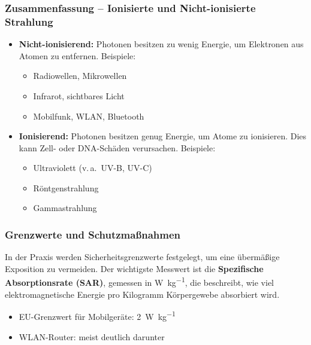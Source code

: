 \subsubsection{Zusammenfassung -- Ionisierte und  \newline Nicht-ionisierte Strahlung}
\vspace{1em}
\begin{tcolorbox}[physikbox,title=Ionisierende und Nicht-ionisierende Strahlung]
	\label{box:ionisierende}
	\begin{itemize}
		\item \textbf{Nicht-ionisierend:} Photonen besitzen zu wenig Energie, um Elektronen aus Atomen zu entfernen. Beispiele:
		\begin{itemize}
			\item Radiowellen, Mikrowellen
			\item Infrarot, sichtbares Licht
			\item Mobilfunk, WLAN, Bluetooth
		\end{itemize}
		\item \textbf{Ionisierend:} Photonen besitzen genug Energie, um Atome zu ionisieren. Dies kann Zell- oder DNA-Schäden verursachen. Beispiele:
		\begin{itemize}
			\item Ultraviolett (v.\,a.\ UV-B, UV-C)
			\item Röntgenstrahlung
			\item Gammastrahlung
		\end{itemize}
	\end{itemize}
\end{tcolorbox}
\vspace{1em}
\subsubsection{Grenzwerte und Schutzmaßnahmen}

In der Praxis werden Sicherheitsgrenzwerte festgelegt, um eine übermäßige Exposition zu vermeiden. Der wichtigste Messwert ist die \textbf{Spezifische Absorptionsrate (SAR)}, gemessen in \si{\watt\per\kilogram}, die beschreibt, wie viel elektromagnetische Energie pro Kilogramm Körpergewebe absorbiert wird.

\begin{itemize}
	\item EU-Grenzwert für Mobilgeräte: \SI{2}{\watt\per\kilogram}
	\item WLAN-Router: meist deutlich darunter
\end{itemize}

